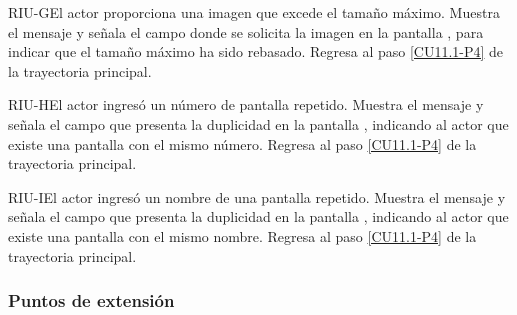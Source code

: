 	\begin{UCtrayectoriaA}{RIU-G}{El actor proporciona una imagen que excede el tamaño máximo.}
		\UCpaso[\UCsist] Muestra el mensaje  y señala el campo donde se solicita la imagen en la pantalla , para indicar que el tamaño máximo ha sido rebasado.
		\UCpaso Regresa al paso \ref{CU11.1-P4} de la trayectoria principal.
	\end{UCtrayectoriaA}
	
	\begin{UCtrayectoriaA}{RIU-H}{El actor ingresó un número de pantalla repetido.}
		\UCpaso[\UCsist] Muestra el mensaje  y señala el campo que presenta la duplicidad en la pantalla , indicando al actor que existe una pantalla con el mismo número.
		\UCpaso Regresa al paso \ref{CU11.1-P4} de la trayectoria principal.
	\end{UCtrayectoriaA}

	\begin{UCtrayectoriaA}{RIU-I}{El actor ingresó un nombre de una pantalla repetido.}
		\UCpaso[\UCsist] Muestra el mensaje  y señala el campo que presenta la duplicidad en la pantalla , indicando al actor que existe una pantalla con el mismo nombre.
		\UCpaso Regresa al paso \ref{CU11.1-P4} de la trayectoria principal.
	\end{UCtrayectoriaA}


\subsubsection{Puntos de extensión}

